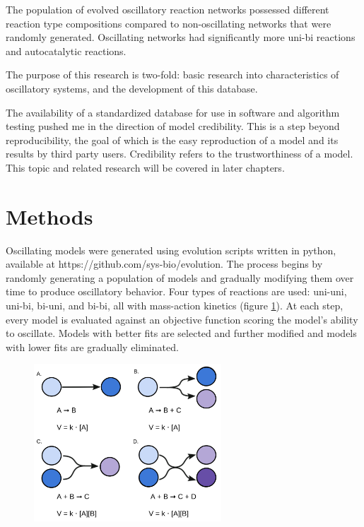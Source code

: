 \documentclass[12pt]{report}
\begin{document}
The population of evolved oscillatory reaction networks possessed different reaction type compositions compared to non-oscillating networks that were randomly generated. Oscillating networks had significantly more uni-bi reactions and autocatalytic reactions. 


The purpose of this research is two-fold: basic research into characteristics of oscillatory systems, and the development of this database.

The availability of a standardized database for use in software and algorithm testing pushed me in the direction of model credibility. This is a step beyond reproducibility, the goal of which is the easy reproduction of a model and its results by third party users. Credibility refers to the trustworthiness of a model. This topic and related research will be covered in later chapters.

\section{Methods}



Oscillating models were generated using evolution scripts written in python, available at https://github.com/sys-bio/evolution. The process begins by randomly generating a population of models and gradually modifying them over time to produce oscillatory behavior. Four types of reactions are used: uni-uni, uni-bi, bi-uni, and bi-bi, all with mass-action kinetics (figure \ref{fig:reaction}). At each step, every model is evaluated against an objective function scoring the model's ability to oscillate. Models with better fits are selected and further modified and models with lower fits are gradually eliminated. 
\begin{figure}
    \centering
    \includegraphics[width=7cm]{images/Reactions.png}
    \label{fig:reaction}
    
\end{figure}
\end{document}
